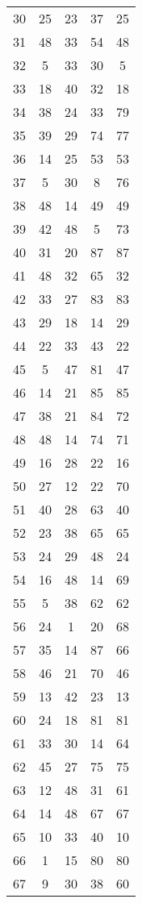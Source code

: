 \documentclass[a4paper,10pt,ngerman]{scrartcl}
\begin{document}
\begin{longtable}[c]{c|c|c|c|c}
    30 & 25 & 23 & 37 & 25 \\
    31 & 48 & 33 & 54 & 48 \\
    32 & 5 & 33 & 30 & 5 \\
    33 & 18 & 40 & 32 & 18 \\
    34 & 38 & 24 & 33 & 79 \\
    35 & 39 & 29 & 74 & 77 \\
    36 & 14 & 25 & 53 & 53 \\
    37 & 5 & 30 & 8 & 76 \\
    38 & 48 & 14 & 49 & 49 \\
    39 & 42 & 48 & 5 & 73 \\
    40 & 31 & 20 & 87 & 87 \\
    41 & 48 & 32 & 65 & 32 \\
    42 & 33 & 27 & 83 & 83 \\
    43 & 29 & 18 & 14 & 29 \\
    44 & 22 & 33 & 43 & 22 \\
    45 & 5 & 47 & 81 & 47 \\
    46 & 14 & 21 & 85 & 85 \\
    47 & 38 & 21 & 84 & 72 \\
    48 & 48 & 14 & 74 & 71 \\
    49 & 16 & 28 & 22 & 16 \\
    50 & 27 & 12 & 22 & 70 \\
    51 & 40 & 28 & 63 & 40 \\
    52 & 23 & 38 & 65 & 65 \\
    53 & 24 & 29 & 48 & 24 \\
    54 & 16 & 48 & 14 & 69 \\
    55 & 5 & 38 & 62 & 62 \\
    56 & 24 & 1 & 20 & 68 \\
    57 & 35 & 14 & 87 & 66 \\
    58 & 46 & 21 & 70 & 46 \\
    59 & 13 & 42 & 23 & 13 \\
    60 & 24 & 18 & 81 & 81 \\
    61 & 33 & 30 & 14 & 64 \\
    62 & 45 & 27 & 75 & 75 \\
    63 & 12 & 48 & 31 & 61 \\
    64 & 14 & 48 & 67 & 67 \\
    65 & 10 & 33 & 40 & 10 \\
    66 & 1 & 15 & 80 & 80 \\
    67 & 9 & 30 & 38 & 60 \\

\end{longtable}
\end{document}
